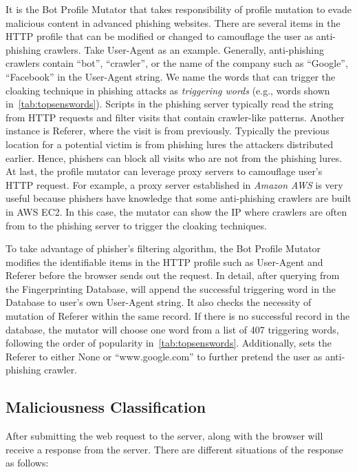 It is the Bot Profile Mutator that takes responsibility of profile mutation to evade malicious content in advanced phishing websites.
There are several items in the HTTP profile that can be modified or changed to camouflage the user as anti-phishing crawlers.
Take User-Agent as an example. 
Generally, anti-phishing crawlers contain ``bot'', ``crawler'', or the name of the company such as ``Google'', ``Facebook'' in the User-Agent string.
We name the words that can trigger the cloaking technique in phishing attacks as \emph{triggering words} (e.g., words shown in~\autoref{tab:topsenswords}).
Scripts in the phishing server typically read the string from HTTP requests and filter visits that contain crawler-like patterns.
Another instance is Referer, where the visit is from previously.
Typically the previous location for a potential victim is from phishing lures the attackers distributed earlier.
Hence, phishers can block all visits who are not from the phishing lures.
At last, the profile mutator can leverage proxy servers to camouflage user's HTTP request.
For example, a proxy server established in \emph{Amazon AWS} is very useful because phishers have knowledge that some anti-phishing crawlers are built in AWS EC2.
In this case, the mutator can show the IP where crawlers are often from to the phishing server to trigger the cloaking techniques.

To take advantage of phisher's filtering algorithm, the Bot Profile Mutator modifies the identifiable items in the HTTP profile such as User-Agent and Referer before the browser sends out the request.
In detail, after querying from the Fingerprinting Database, \spartacus will append the successful triggering word in the Database to user's own User-Agent string.
It also checks the necessity of mutation of Referer within the same record.
If there is no successful record in the database,
the mutator will choose one word from a list of 407 triggering words, following the order of popularity in~\autoref{tab:topsenswords}.
Additionally, \spartacus sets the Referer to either None or ``www.google.com'' to further pretend the user as anti-phishing crawler.


\subsection{Maliciousness Classification}
After submitting the web request to the server, \spartacus along with the browser will receive a response from the server.
There are different situations of the response as follows:

